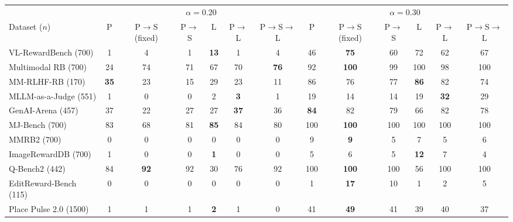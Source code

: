\begin{tabular}{l|cccccc|cccccc}
\toprule
 & \multicolumn{6}{c}{$\alpha=0.20$} & \multicolumn{6}{c}{$\alpha=0.30$}\\
Dataset ($n$) & P & P$\to$S (fixed) & P$\to$S & L & P$\to$L & P$\to$S$\to$L & P & P$\to$S (fixed) & P$\to$S & L & P$\to$L & P$\to$S$\to$L\\
\midrule
VL-RewardBench (700) & 1 & 4 & 1 & \textbf{13} & 1 & 4 & 46 & \textbf{75} & 60 & 72 & 62 & 67\\
Multimodal RB (700) & 24 & 74 & 71 & 67 & 70 & \textbf{76} & 92 & \textbf{100} & 99 & 100 & 98 & 100\\
MM-RLHF-RB (170) & \textbf{35} & 23 & 15 & 29 & 23 & 11 & 86 & 76 & 77 & \textbf{86} & 82 & 74\\
MLLM-as-a-Judge (551) & 1 & 0 & 0 & 2 & \textbf{3} & 1 & 19 & 14 & 14 & 19 & \textbf{32} & 29\\
GenAI-Arena (457) & 37 & 22 & 27 & 27 & \textbf{37} & 36 & \textbf{84} & 82 & 79 & 66 & 82 & 78\\
MJ-Bench (700) & 83 & 68 & 81 & \textbf{85} & 84 & 80 & 100 & \textbf{100} & 100 & 100 & 100 & 100\\
MMRB2 (700) & 0 & 0 & 0 & 0 & 0 & 0 & 9 & \textbf{9} & 5 & 7 & 5 & 6\\
ImageRewardDB (700) & 1 & 0 & 0 & \textbf{1} & 0 & 0 & 5 & 6 & 5 & \textbf{12} & 7 & 4\\
Q-Bench2 (442) & 84 & \textbf{92} & 92 & 30 & 76 & 92 & 100 & \textbf{100} & 100 & 56 & 100 & 100\\
EditReward-Bench (115) & 0 & 0 & 0 & 0 & 0 & 0 & 1 & \textbf{17} & 10 & 1 & 2 & 5\\
Place Pulse 2.0 (1500) & 1 & 1 & 1 & \textbf{2} & 1 & 0 & 41 & \textbf{49} & 41 & 39 & 40 & 37\\
\bottomrule
\end{tabular}
